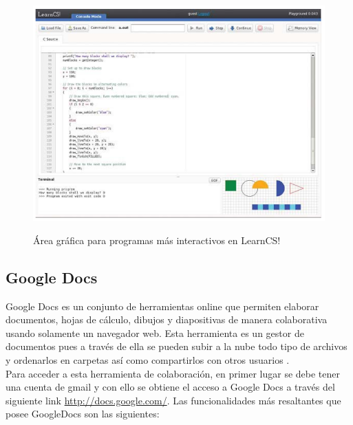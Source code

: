 \begin{figure}[!h]
  \centering
  \includegraphics[scale=0.5]{figuras/learncs2.png}\\
  \caption[LearnCS]{Área gráfica para programas más interactivos en LearnCS! \protect\cite{lipman_learncs_2014}}\label{fig:learncs2}
\end{figure}

\subsection{Google Docs}

Google Docs es un conjunto de herramientas online que permiten elaborar documentos, hojas de cálculo, dibujos y diapositivas de manera colaborativa usando solamente un navegador web. Esta herramienta es un gestor de documentos pues a través de ella se pueden subir a la nube todo tipo de archivos y ordenarlos en carpetas así como compartirlos con otros usuarios \cite{googledocs}.\\

Para acceder a esta herramienta de colaboración, en primer lugar se debe tener una cuenta de gmail y con ello se obtiene el acceso a Google Docs a través del siguiente link \url{http://docs.google.com/}. Las funcionalidades más resaltantes que posee GoogleDocs son las siguientes: \cite{googledocs}\\

